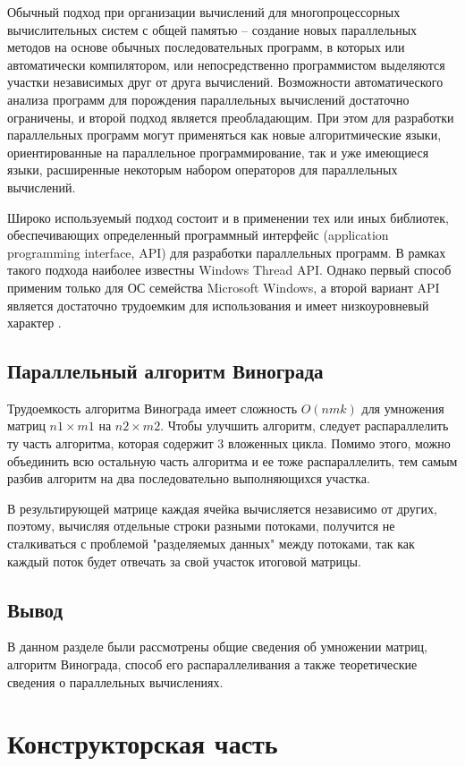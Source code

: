 \documentclass[a4paper, 14pt]{article}
\begin{document}
	Обычный подход при организации вычислений для многопроцессорных вычислительных систем с общей памятью – создание новых параллельных методов на основе обычных последовательных программ, в которых или автоматически компилятором, или непосредственно программистом выделяются участки независимых друг от друга вычислений. Возможности автоматического анализа программ для порождения параллельных вычислений достаточно ограничены, и второй подход является преобладающим. При этом для разработки параллельных программ могут применяться как новые алгоритмические языки, ориентированные на параллельное программирование, так и уже имеющиеся языки, расширенные некоторым набором операторов для параллельных вычислений.
	
	Широко используемый подход состоит и в применении тех или иных библиотек, обеспечивающих определенный программный интерфейс (application programming interface, API) для разработки параллельных программ. В рамках такого подхода наиболее известны Windows Thread API. Однако первый способ применим только для ОС семейства Microsoft Windows, а второй вариант API является достаточно трудоемким для использования и имеет низкоуровневый характер \cite{Barkalov}.
	\subsection{Параллельный алгоритм Винограда}
	Трудоемкость алгоритма Винограда имеет сложность $O(nmk)$ для умножения матриц $n1 \times m1$ на $n2 \times m2$. Чтобы улучшить алгоритм, следует распараллелить ту часть алгоритма, которая содержит 3 вложенных цикла. Помимо этого, можно объединить всю остальную часть алгоритма и ее тоже распараллелить, тем самым разбив алгоритм на два последовательно выполняющихся участка.
	
	В результирующей матрице каждая ячейка вычисляется независимо от других, поэтому, вычисляя отдельные строки разными потоками, получится не сталкиваться с проблемой "разделяемых данных" между потоками, так как каждый поток будет отвечать за свой участок итоговой матрицы.
	
	   
    \subsection{Вывод}
    В данном разделе были рассмотрены общие сведения об умножении матриц, алгоритм Винограда, способ его распараллеливания а также теоретические сведения о параллельных вычислениях.
     	\newpage
        \section{Конструкторская часть}
        
\end{document}
